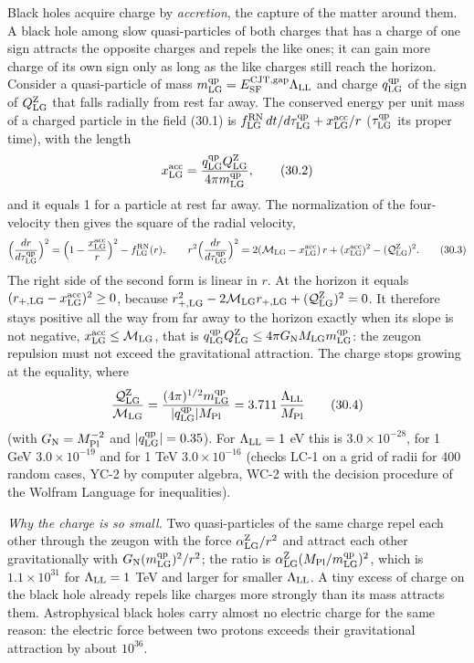 \documentclass[
  10pt,
]{article}
\begin{document}
Black holes acquire charge by \emph{accretion}, the capture of the
matter around them. A black hole among slow quasi-particles of both
charges that has a charge of one sign attracts the opposite charges and
repels the like ones; it can gain more charge of its own sign only as
long as the like charges still reach the horizon. Consider a
quasi-particle of mass
\(m^{\rm qp}_{\rm LG}=E^{\rm CJT,gap}_{\rm SF}\Lambda_{\rm LL}\) and
charge \(q^{\rm qp}_{\rm LG}\) of the sign of \(Q^{\rm Z}_{\rm LG}\)
that falls radially from rest far away. The conserved energy per unit
mass of a charged particle in the field (30.1) is
\(f^{\rm RN}_{\rm LG}\,dt/d\tau^{\rm qp}_{\rm LG}+x^{\rm acc}_{\rm LG}/r\)
(\(\tau^{\rm qp}_{\rm LG}\) its proper time), with the length
\[x^{\rm acc}_{\rm LG}=\frac{q^{\rm qp}_{\rm LG}Q^{\rm Z}_{\rm LG}}{4\pi m^{\rm qp}_{\rm LG}},\tag{30.2}\]
and it equals 1 for a particle at rest far away. The normalization of
the four-velocity then gives the square of the radial velocity,
\[\Big(\frac{dr}{d\tau^{\rm qp}_{\rm LG}}\Big)^2=\Big(1-\frac{x^{\rm acc}_{\rm LG}}r\Big)^2-f^{\rm RN}_{\rm LG}(r),\qquad r^2\Big(\frac{dr}{d\tau^{\rm qp}_{\rm LG}}\Big)^2=2(\mathcal M_{\rm LG}-x^{\rm acc}_{\rm LG})\,r+(x^{\rm acc}_{\rm LG})^2-(\mathcal Q^{\rm Z}_{\rm LG})^2.\tag{30.3}\]
The right side of the second form is linear in \(r\). At the horizon it
equals \((r_{+,\rm LG}-x^{\rm acc}_{\rm LG})^2\ge0\), because
\(r_{+,\rm LG}^2-2\mathcal M_{\rm LG}r_{+,\rm LG}+(\mathcal Q^{\rm Z}_{\rm LG})^2=0\).
It therefore stays positive all the way from far away to the horizon
exactly when its slope is not negative,
\(x^{\rm acc}_{\rm LG}\le\mathcal M_{\rm LG}\), that is
\(q^{\rm qp}_{\rm LG}Q^{\rm Z}_{\rm LG}\le4\pi G_{\rm N}M_{\rm LG}m^{\rm qp}_{\rm LG}\):
the zeugon repulsion must not exceed the gravitational attraction. The
charge stops growing at the equality, where
\[\frac{\mathcal Q^{\rm Z}_{\rm LG}}{\mathcal M_{\rm LG}}=\frac{(4\pi)^{1/2}m^{\rm qp}_{\rm LG}}{\lvert q^{\rm qp}_{\rm LG}\rvert M_{\rm Pl}}=3.711\,\frac{\Lambda_{\rm LL}}{M_{\rm Pl}}\tag{30.4}\]
(with \(G_{\rm N}=M_{\rm Pl}^{-2}\) and
\(\lvert q^{\rm qp}_{\rm LG}\rvert=0.35\)). For \(\Lambda_{\rm LL}=1\)
eV this is \(3.0\times10^{-28}\), for 1 GeV \(3.0\times10^{-19}\) and
for 1 TeV \(3.0\times10^{-16}\) (checks LC-1 on a grid of radii for 400
random cases, YC-2 by computer algebra, WC-2 with the decision procedure
of the Wolfram Language for inequalities).

\emph{Why the charge is so small.} Two quasi-particles of the same
charge repel each other through the zeugon with the force
\(\alpha^{\rm Z}_{\rm LG}/r^2\) and attract each other gravitationally
with \(G_{\rm N}(m^{\rm qp}_{\rm LG})^2/r^2\); the ratio is
\(\alpha^{\rm Z}_{\rm LG}(M_{\rm Pl}/m^{\rm qp}_{\rm LG})^2\), which is
\(1.1\times10^{31}\) for \(\Lambda_{\rm LL}=1\) TeV and larger for
smaller \(\Lambda_{\rm LL}\). A tiny excess of charge on the black hole
already repels like charges more strongly than its mass attracts them.
Astrophysical black holes carry almost no electric charge for the same
reason: the electric force between two protons exceeds their
gravitational attraction by about \(10^{36}\).
\end{document}
